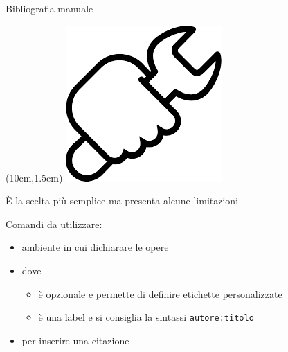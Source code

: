\begin{frame}[fragile]{Bibliografia manuale}

\begin{textblock*}{2cm}(10cm,1.5cm)
      \includegraphics[scale=0.30]{res/images/manual}
\end{textblock*}

È la scelta più semplice ma presenta alcune limitazioni

\vfill

Comandi da utilizzare:
\begin{itemize}
	\item {} ambiente in cui dichiarare le opere
	\item {} dove
	\begin{itemize}
		\item {} è opzionale
		e permette di definire etichette personalizzate
		\item {} è una label e si
		consiglia la sintassi \texttt{autore:titolo}
	\end{itemize}
	\item {} per inserire una
	citazione
\end{itemize}

\end{frame}